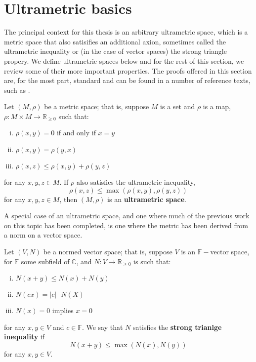 \section{Ultrametric basics}

The principal context for this thesis is an arbitrary ultrametric space, which is a metric space that also satisifies an additional axion, sometimes called the ultrametric inequality or (in the case of vector spaces) the strong triangle propery. We define  ultrametric spaces below and for the rest of this section, we review some of their more important properties. The proofs offered in this section are, for the most part, standard and can be found in a number of reference texts, such as \cite{ar}.\\

\begin{definition}
	 Let $(M, \rho)$ be a metric space; that is, suppose $M$ is a set and $\rho$ is a map, $\rho: M \times M \rightarrow \mathbb{R}_{\geq 0}$ such that:
	\begin{enumerate}[(i)]
		\item $\rho(x,y) = 0$ if and only if $x=y$
		\item $\rho(x,y) = \rho(y,x)$
		\item $\rho(x,z) \leq \rho(x,y) + \rho(y,z)$
	\end{enumerate}
	for any $x,y,z \in M$. If $\rho$ also satisfies the ultrametric inequality,	
		\[ \rho(x,z) \leq \max{(\rho(x,y), \rho(y,z))}\]
for any $x,y,z \in M$, then $(M, \rho)$ is an \textbf{ultrametric space}.
\end{definition}

A special case of an ultrametric space, and one where much of the previous work on this topic has been completed, is one where the metric has been derived from a norm on a vector space. \\

\begin{definition}
	 Let $(V, N)$ be a normed vector space; that is, suppose $V$ is an $\mathbb{F-}$vector space, for $\mathbb{F}$ some subfield of $\mathbb{C}$, and $N: V \rightarrow \mathbb{R}_{\geq 0}$  is such that:
	\begin{enumerate}[(i)]
		\item $N(x +y ) \leq N(x) + N(y)$
		\item $N(cx) = \lvert c \rvert \text{ } N(X)$
		\item $N(x) = 0$ implies $x=0$
	\end{enumerate}
	for any $x,y \in V$ and $c \in \mathbb{F}$. We say that $N$ satisfies the \textbf{strong trianlge inequality} if
	\[ N(x + y) \leq \max(N(x), N(y)) \]
	for any $x,y \in V$.
\end{definition}


